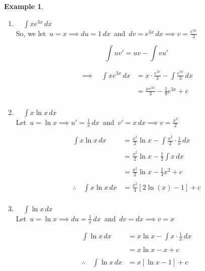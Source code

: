 \documentclass[11pt,a4paper]{article}
\theoremstyle{definition}
\newtheorem{example}[thm]{Example}
\begin{document}
\pagebreak
\begin{example}

\begin{enumerate}
\item $\quad \displaystyle{\int xe^{3x}\,dx}$\\

So, we let $\, u = x \implies du = 1\, dx\,$ and $\, dv = e^{3x}\,dx \implies v = \frac{e^{3x}}{3}$ 

$$\int uv' = uv - \int v u'$$

\begin{align*}
\implies \quad  \int xe^{3x}\,dx & = x\cdot\frac{e^{3x}}{3} - \int \frac{e^{3x}}{3}\,dx\\\\
& = \frac{xe^{3x}}{3}-\frac{1}{9}e^{3x} + c\\
\end{align*}




\item $\quad  \displaystyle{\int x \ln x \,dx}$\\

Let $\, u = \ln x \implies u' = \frac{1}{x}\,dx\,$ and $\,  v' = x\,dx \implies v = \frac{x^2}{2}$

\begin{align*}
\int x \ln x \,dx & = \frac{x^2}{2}\ln x - \int \frac{x^2}{2}\cdot \frac{1}{x}\,dx\\\\
& = \frac{x^2}{2}\ln x - \frac{1}{2}\int x\,dx\\\\
& = \frac{x^2}{2}\ln x - \frac{1}{4}x^2 + c\\\\
\therefore\quad  \int x \ln x \,dx & = \frac{x^2}{4}\left[2\ln(x) - 1\right] + c\\
\end{align*}






\item $\quad \displaystyle{\int \ln x\,dx}$\\

Let $\, u = \ln x \implies du = \frac{1}{x}\,dx\,$ and $\, dv = dx \implies v = x$

\begin{align*}
\int \ln x\,dx & = x\ln x - \int x\cdot \frac{1}{x}\,dx\\\\
& = x\ln x - x + c\\\\
\therefore\quad \int \ln x\,dx &  = x \left[\ln x - 1\right] + c\\\\
\end{align*}
\end{enumerate}
\end{example}
\end{document}

